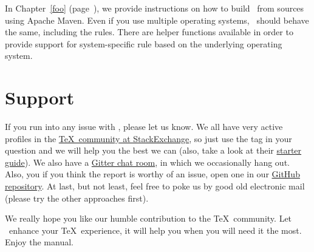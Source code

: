 In Chapter~\ref{foo} (page~\pageref{foo}), we provide instructions on how to build \arara\ from sources using Apache Maven. Even if you use multiple operating systems, \arara\ should behave the same, including the rules. There are helper functions available in order to provide support for system-specific rule based on the underlying operating system.

\section{Support}
\label{sec:support}

If you run into any issue with \arara, please let us know. We all have very active profiles in the \href{https://tex.stackexchange.com/}{\TeX\ community at StackExchange}, so just use the  tag in your question and we will help you the best we can (also, take a look at their \href{https://tex.meta.stackexchange.com/q/1436}{starter guide}).  We also have a \href{https://gitter.im/cereda/arara}{Gitter chat room}, in which we occasionally hang out. Also, you if you think the report is worthy of an issue, open one in our \href{https://github.com/cereda/arara/issues}{GitHub repository}. At last, but not least, feel free to poke us by good old electronic mail (please try the other approaches first).

We really hope you like our humble contribution to the \TeX\ community. Let \arara\ enhance your \TeX\ experience, it will help you when you will need it the most. Enjoy the manual.
